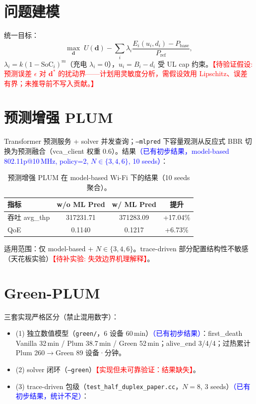 \documentclass[journal,10pt]{IEEEtran}
\newcommand{\todoexp}[1]{\textcolor{red}{【待补实验: #1】}}
\newcommand{\todothy}[1]{\textcolor{red}{【待验证假设: #1】}}
\newcommand{\prelim}[1]{\textcolor{blue}{#1}}
\begin{document}
\section{问题建模}
统一目标：
\begin{equation}
\max_{\mathbf d}\; U(\mathbf d)-\sum_i \lambda_i\frac{E_i(u_i,d_i)-P_{\text{base}}}{P_{\text{ref}}},
\end{equation}
$\lambda_i=k(1-\mathrm{SoC}_i)^m$（充电 $\lambda_i=0$），$u_i=B_i-d_i$ 受 UL cap 约束。\todothy{预测误差 $\epsilon$ 对 $\mathbf d^*$ 的扰动界——计划用灵敏度分析，需假设效用 Lipschitz、误差有界；未推导前不写入贡献。}

\section{预测增强 PLUM}
Transformer 预测服务 + solver 并发查询；\texttt{--mlpred} 下容量观测从反应式 BBR 切换为预测融合（vca\_client 权重 0.6）。结果\prelim{（已有初步结果，model-based 802.11p@10\,MHz, policy=2, $N\in\{3,4,6\}$, 10 seeds）}：

\begin{table}[ht]
\centering\small
\caption{预测增强 PLUM 在 model-based Wi-Fi 下的结果（10 seeds 聚合）。}
\label{tab:pred}
\begin{tabular}{lccc}
\toprule
指标 & w/o ML Pred & w/ ML Pred & 提升 \\
\midrule
吞吐 avg\_thp & 317231.71 & 371283.09 & +17.04\% \\
QoE & 0.1140 & 0.1217 & +6.73\% \\
\bottomrule
\end{tabular}
\end{table}

\noindent 适用范围：仅 model-based + $N\in\{3,4,6\}$。trace-driven 部分配置结构性不敏感（天花板实验）\todoexp{失效边界机理解释}。

\section{Green-PLUM}
三套实现严格区分（禁止混用数字）：
\begin{itemize}
  \item (1) 独立数值模型（\texttt{green/}，6 设备 60\,min）\prelim{（已有初步结果）}：first\_death Vanilla 32\,min / Plum 38.7\,min / Green 52\,min；alive\_end 3/4/4；过热累计 Plum 260$\to$Green 89 设备·分钟。
  \item (2) solver 闭环（\texttt{--green}）\textcolor{red}{【实现但未可靠验证：结果缺失】}。
  \item (3) trace-driven 包级（\texttt{test\_half\_duplex\_paper.cc}，$N=8$, 3 seeds）\prelim{（已有初步结果，统计不足）}：
\end{itemize}
\end{document}
